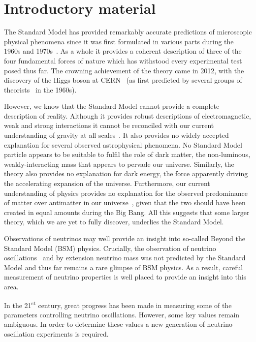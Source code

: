 \chapter{Introductory material}
\label{sec:intro}

The Standard Model has provided remarkably accurate predictions of microscopic physical phenomena since it was first formulated in various parts during the 1960s and 1970s~\cite{glashow1961, weinberg1967, qcdTheory1, qcdTheory2}.
As a whole it provides a coherent description of three of the four fundamental forces of nature which has withstood every experimental test posed thus far. 
The crowning achievement of the theory came in 2012, with the discovery of the Higgs boson at CERN~\cite{higgsDiscoveryATLAS, higgsDiscoveryCMS} (as first predicted by several groups of theorists~\cite{higgsTheory1, higgsTheory2, higgsTheory3} in the 1960s).

However, we know that the Standard Model cannot provide a complete description of reality.
Although it provides robust descriptions of electromagnetic, weak and strong interactions it cannot be reconciled with our current understanding of gravity at all scales~\cite{quantumGravity}.
It also provides no widely accepted explanation for several observed astrophysical phenomena.
No Standard Model particle appears to be suitable to fulfil the role of dark matter, the non-luminous, weakly-interacting mass that appears to pervade our universe.
Similarly, the theory also provides no explanation for dark energy, the force apparently driving the accelerating expansion of the universe.
Furthermore, our current understanding of physics provides no explanation for the observed predominance of matter over antimatter in our universe~\cite{matterAntimatterAMS}, given that the two should have been created in equal amounts during the Big Bang.
All this suggests that some larger theory, which we are yet to fully discover, underlies the Standard Model.

Observations of neutrinos may well provide an insight into so-called Beyond the Standard Model (BSM) physics.
Crucially, the observation of neutrino oscillations~\cite{SNO, superK} and by extension neutrino mass was not predicted by the Standard Model and thus far remains a rare glimpse of BSM physics.
As a result, careful measurement of neutrino properties is well placed to provide an insight into this area.

In the 21\textsuperscript{st} century, great progress has been made in measuring some of the parameters controlling neutrino oscillations.
However, some key values remain ambiguous.
In order to determine these values a new generation of neutrino oscillation experiments is required.

